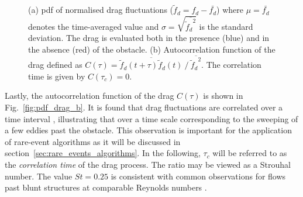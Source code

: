 \documentclass{jfm}
\newcommand{\EL}[1]{{\color{myred}{#1}}}
\newcommand{\QQ}[1]{{\color{green}{#1}}}
\begin{document}
\begin{figure}
	\centering
	\caption{{(a)} \ac{pdf} of normalised drag fluctuations ($\tilde f_d = f_d - \bar{f_d}$) where $\mu = \bar{f_d}$ denotes the time-averaged value and $\sigma = \sqrt{\overline{{\tilde f_d}^2}}$ is the standard deviation. The drag is evaluated both in the presence (blue) and in the absence (red) of the obstacle. %
		\QQ{x-axis should be $x = (f_d-\mu)/\sigma)$ and y-axis $P(x)$)}
		{(b)} Autocorrelation function of the drag defined as $C(\tau) = \overline{ \tilde f_d(t+\tau)\tilde f_d(t)} ~/~ \overline{{\tilde f_d}^2}$. The correlation time \EL{$\tau_c\simeq 4 T_0$} is given by $C(\tau_c)=0$.
	}
	\label{fig:pdf_drag}
\end{figure}

Lastly, the autocorrelation function of the drag $C(\tau)$ is shown in Fig.~\ref{fig:pdf_drag_b}. It is found that drag fluctuations are correlated over a time interval \EL{$\tau_c \simeq 4T_0$}, illustrating that \EL{the drag loses its memory}  over a time scale corresponding to the sweeping of a few eddies past the obstacle.
%
This observation is important for the application of rare-event algorithms as it will be discussed in section~\ref{sec:rare_events_algorithms}.
%
In the following, $\tau_c$ will be referred to as the \textit{correlation time} of the drag process.
The ratio \EL{$T_0 / \tau_c$} may be viewed as a {Strouhal number}. The value $St=0.25$ is consistent with common observations for flows past blunt structures at comparable Reynolds numbers \EL{\citep{rodi1998}}.
\end{document}
